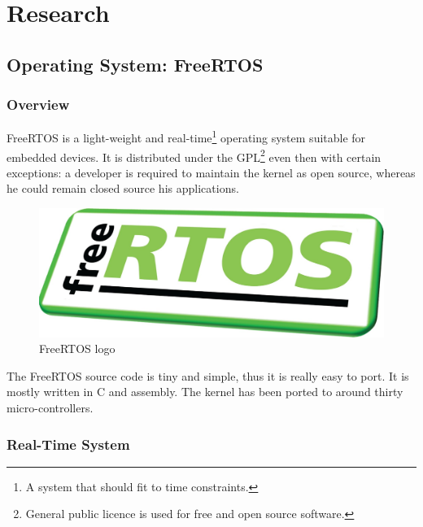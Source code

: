 \chapter{Research}\label{chap:research}

\section{Operating System: FreeRTOS}

\subsection{Overview}


\hspace{15mm}FreeRTOS is a light-weight and real-time\footnote{A system that should fit to time constraints.} operating system suitable for embedded devices. It is distributed under the GPL\footnote{General public licence is used for free and open source software.} even then with certain exceptions: a developer is required to maintain the kernel as open source, whereas he could remain closed source his applications.

\begin{figure}[h]
  \centering
  \includegraphics[scale=0.125]{images/freertos.jpg}
  \caption{FreeRTOS logo}
\end{figure}

The FreeRTOS source code is tiny and simple, thus it is really easy to port. It is mostly written in C and assembly. The kernel has been ported to around thirty micro-controllers.  


\subsection{Real-Time System}

